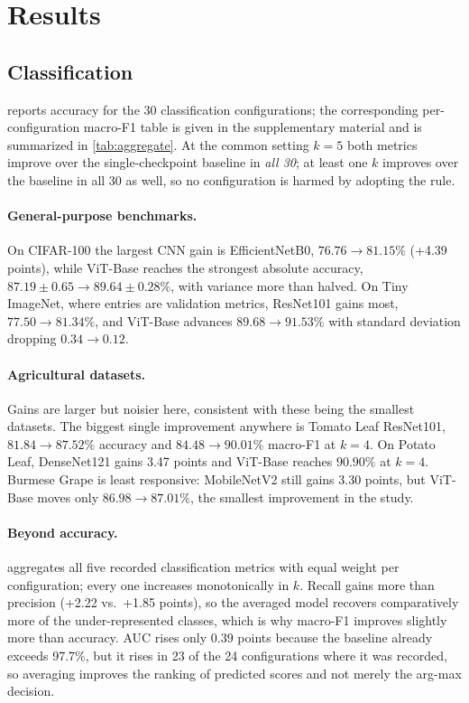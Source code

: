 \section{Results}
\label{sec:results}



\subsection{Classification}

 reports accuracy for the 30 classification
configurations; the corresponding per-configuration macro-F1 table is given in
the supplementary material and is summarized in \cref{tab:aggregate}. At the common setting $k{=}5$ both metrics
improve over the single-checkpoint baseline in \emph{all 30}; at least one $k$
improves over the baseline in all 30 as well, so no configuration is harmed by
adopting the rule.

\paragraph{General-purpose benchmarks.}
On CIFAR-100 the largest CNN gain is EfficientNetB0, $76.76\to81.15\%$
(+4.39 points), while ViT-Base reaches the strongest absolute accuracy,
$87.19\pm0.65\to89.64\pm0.28\%$, with variance more than halved. On Tiny
ImageNet, where entries are validation metrics, ResNet101 gains most,
$77.50\to81.34\%$, and ViT-Base advances $89.68\to91.53\%$ with standard
deviation dropping $0.34\to0.12$.

\paragraph{Agricultural datasets.}
Gains are larger but noisier here, consistent with these being the smallest
datasets. The biggest single improvement anywhere is Tomato Leaf ResNet101,
$81.84\to87.52\%$ accuracy and $84.48\to90.01\%$ macro-F1 at $k{=}4$. On Potato
Leaf, DenseNet121 gains 3.47 points and ViT-Base reaches $90.90\%$ at $k{=}4$.
Burmese Grape is least responsive: MobileNetV2 still gains 3.30 points, but
ViT-Base moves only $86.98\to87.01\%$, the smallest improvement in the study.

\paragraph{Beyond accuracy.}
 aggregates all five recorded classification metrics with
equal weight per configuration; every one increases monotonically in $k$.
Recall gains more than precision (+2.22 vs.\ +1.85 points), so the averaged
model recovers comparatively more of the under-represented classes, which is
why macro-F1 improves slightly more than accuracy. AUC rises only 0.39 points
because the baseline already exceeds 97.7\%, but it rises in 23 of the 24
configurations where it was recorded, so averaging improves the ranking of
predicted scores and not merely the arg-max decision.


